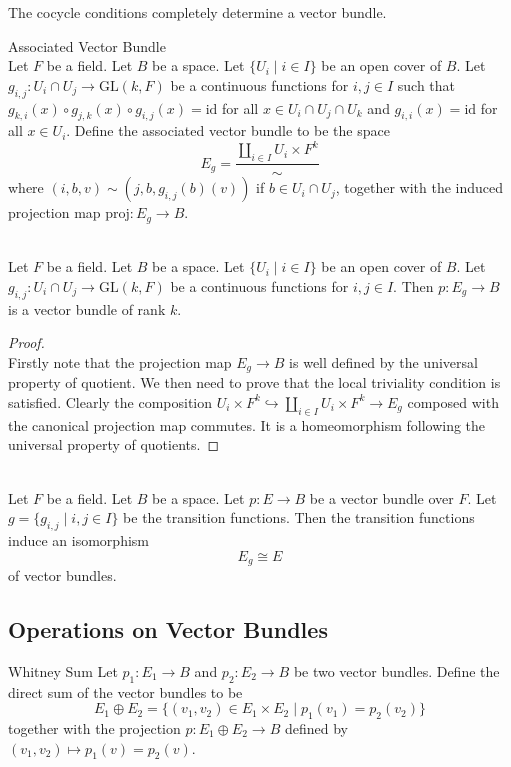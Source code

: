 \documentclass[a4paper]{article}
\begin{document}
The cocycle conditions completely determine a vector bundle. 

\begin{defn}{Associated Vector Bundle}{}\\
Let $F$ be a field. Let $B$ be a space. Let $\{U_i\;|\;i\in I\}$ be an open cover of $B$. Let $g_{i,j}:U_i\cap U_j\to\text{GL}(k,F)$ be a continuous functions for $i,j\in I$ such that $g_{k,i}(x)\circ g_{j,k}(x)\circ g_{i,j}(x)=\text{id}$ for all $x\in U_i\cap U_j\cap U_k$ and $g_{i,i}(x)=\text{id}$ for all $x\in U_i$. Define the associated vector bundle to be the space $$E_g=\frac{\coprod_{i\in I}U_i\times F^k}{\sim}$$ where $(i,b,v)\sim(j,b,g_{i,j}(b)(v))$ if $b\in U_i\cap U_j$, together with the induced projection map $\text{proj}:E_g\to B$. 
\end{defn}

\begin{lmm}{}{}\\
Let $F$ be a field. Let $B$ be a space. Let $\{U_i\;|\;i\in I\}$ be an open cover of $B$. Let $g_{i,j}:U_i\cap U_j\to\text{GL}(k,F)$ be a continuous functions for $i,j\in I$. Then $p:E_g\to B$ is a vector bundle of rank $k$. 
\begin{proof}\\
Firstly note that the projection map $E_g\to B$ is well defined by the universal property of quotient. We then need to prove that the local triviality condition is satisfied. Clearly the composition $U_i\times F^k\hookrightarrow\coprod_{i\in I}U_i\times F^k\to E_g$ composed with the canonical projection map commutes. It is a homeomorphism following the universal property of quotients. 
\end{proof}
\end{lmm}

\begin{lmm}{}{}\\
Let $F$ be a field. Let $B$ be a space. Let $p:E\to B$ be a vector bundle over $F$. Let $g=\{g_{i,j}\;|\;i,j\in I\}$ be the transition functions. Then the transition functions induce an isomorphism $$E_g\cong E$$ of vector bundles. 
\end{lmm}

\subsection{Operations on Vector Bundles}
\begin{defn}{Whitney Sum}{} Let $p_1:E_1\to B$ and $p_2:E_2\to B$ be two vector bundles. Define the direct sum of the vector bundles to be $$E_1\oplus E_2=\{(v_1,v_2)\in E_1\times E_2\;|\;p_1(v_1)=p_2(v_2)\}$$ together with the projection $p:E_1\oplus E_2\to B$ defined by $(v_1,v_2)\mapsto p_1(v)=p_2(v)$. 
\end{defn}
\end{document}
